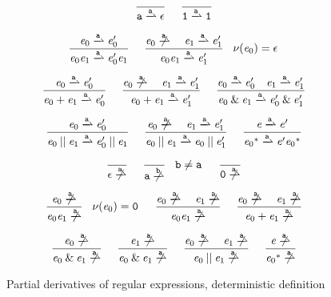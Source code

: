 \begin{figure}
 $$
  \begin{array}{c}
   \simpleRule{}{\sym\parDer{\sym}\eps}{}\quad
   \simpleRule{}{\all\parDer{\sym}\all}{}                                                                                   \\[4ex]
   \simpleRule{\re_0\parDer{\sym}\re'_0}{\re_0\catop\re_1\parDer{\sym}\re'_0\catop\re_1}{}\quad
   \simpleRule{\re_0\noParDer{\sym}\quad\re_1\parDer{\sym}\re'_1}{\re_0\catop\re_1\parDer{\sym}\re'_1}{\hasEps{\re_0}=\eps} \\[4ex]
   \simpleRule{\re_0\parDer{\sym}\re'_0}{\re_0\orop\re_1\parDer{\sym}\re'_0}{}\quad
   \simpleRule{\re_0\noParDer{\sym}\quad\re_1\parDer{\sym}\re'_1}{\re_0\orop\re_1\parDer{\sym}\re'_1}{}\quad
   \simpleRule{\re_0\parDer{\sym}\re'_0\quad\re_1\parDer{\sym}\re'_1}{\re_0\andop\re_1\parDer{\sym}\re'_0\andop\re'_1}{}    \\[4ex]
   \simpleRule{\re_0\parDer{\sym}\re'_0}{\re_0\shuffleop\re_1\parDer{\sym}\re'_0\shuffleop\re_1}{}\quad
   \simpleRule{\re_0\noParDer{\sym}\quad\re_1\parDer{\sym}\re'_1}{\re_0\shuffleop\re_1\parDer{\sym}\re_0\shuffleop\re'_1}{}\quad
   \simpleRule{\re\parDer{\sym}\re'}{\starop{\re_0}\parDer{\sym}\re'\starop{\re_0}}{}                                       \\[4ex]
   \simpleRule{}{\eps\noParDer{\sym}}{}\quad
   \simpleRule{}{\sym\noParDer{\asym}}{\asym\neq\sym}\quad
   \simpleRule{}{\none\noParDer{\sym}}{}                                                                                    \\[4ex]
   \simpleRule{\re_0\noParDer{\sym}}{\re_0\catop\re_1\noParDer{\sym}}{\hasEps{\re_0}=\none}\quad
   \simpleRule{\re_0\noParDer{\sym}\quad\re_1\noParDer{\sym}}{\re_0\catop\re_1\noParDer{\sym}}{} \quad
   \simpleRule{\re_0\noParDer{\sym}\quad\re_1\noParDer{\sym}}{\re_0\orop\re_1\noParDer{\sym}}{}                             \\[4ex]
   \simpleRule{\re_0\noParDer{\sym}}{\re_0\andop\re_1\noParDer{\sym}}{}\quad
   \simpleRule{\re_1\noParDer{\sym}}{\re_0\andop\re_1\noParDer{\sym}}{}\quad
   \simpleRule{\re_0\noParDer{\sym}\quad\re_1\noParDer{\sym}}{\re_0\shuffleop\re_1\noParDer{\sym}}{}\quad
   \simpleRule{\re\noParDer{\sym}}{\starop{\re_0}\noParDer{\sym}}{}
  \end{array}
 $$
 \caption{Partial derivatives of regular expressions, deterministic definition}
 \label{fig:reg-exp-par-der}
\end{figure}


